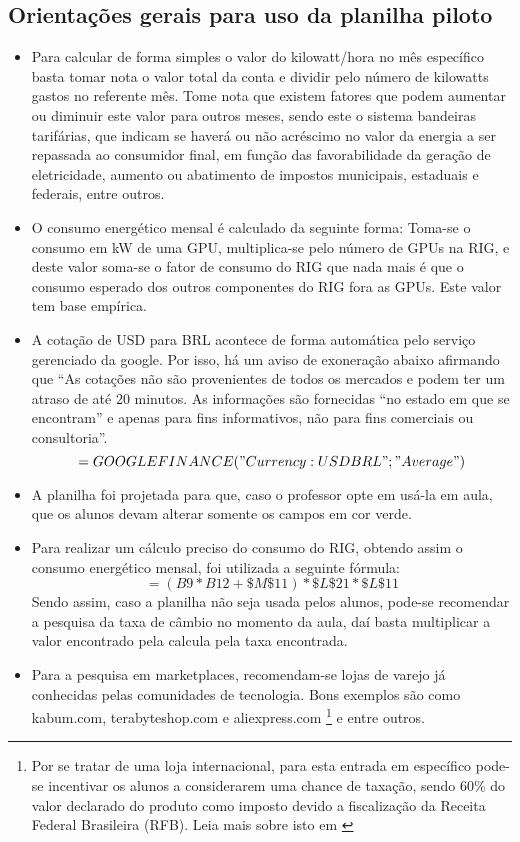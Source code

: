 \subsection{Orientações gerais para uso da planilha piloto}
\begin{itemize} 
	\item Para calcular de forma simples o valor do kilowatt/hora no mês específico basta tomar nota o valor total da conta e dividir pelo número de kilowatts gastos no referente mês. Tome nota que existem fatores que podem aumentar ou diminuir este valor para outros meses, sendo este o sistema bandeiras tarifárias, que indicam se haverá ou não acréscimo no valor da energia a ser repassada ao consumidor final, em função das favorabilidade da geração de eletricidade, aumento ou abatimento de impostos municipais, estaduais e federais, entre outros.
	\item O consumo energético mensal é calculado da seguinte forma:
	Toma-se o consumo em kW de uma GPU,  multiplica-se pelo número de GPUs na RIG, e deste valor soma-se o fator de consumo do RIG que nada mais é que o consumo esperado dos outros componentes do RIG fora as GPUs. Este valor tem base empírica.   
	\item {} A cotação de USD para BRL acontece de forma automática pelo serviço gerenciado da google. Por isso, há um aviso de exoneração abaixo afirmando que ``As cotações não são provenientes de todos os mercados e podem ter um atraso de até 20 minutos. As informações são fornecidas ``no estado em que se encontram'' e apenas para fins informativos, não para fins comerciais ou consultoria''. 
	\begin{equation}\label{key1}
		=GOOGLEFINANCE("Currency:USDBRL";"Average")
	\end{equation}
	\item A planilha foi projetada para que, caso o professor opte em usá-la em aula, que os alunos devam alterar somente os campos em cor verde.
	\item Para realizar um cálculo preciso do consumo do RIG,  obtendo assim o consumo energético mensal, foi utilizada a seguinte fórmula: 
	\begin{equation}\label{key}
		= (B9*B12+\$M\$11)*\$L\$21*\$L\$11
	\end{equation} 
	Sendo assim, caso a planilha não seja usada pelos alunos, pode-se recomendar a pesquisa da taxa de câmbio no momento da aula, daí basta multiplicar a valor encontrado pela calcula pela taxa encontrada.
	\item {} Para a pesquisa em marketplaces, recomendam-se lojas de varejo já conhecidas pelas comunidades de tecnologia. Bons exemplos são como kabum.com, terabyteshop.com e aliexpress.com \footnote{Por se tratar de uma loja internacional, para esta entrada em específico pode-se incentivar os alunos a considerarem uma chance de taxação, sendo 60\% do valor declarado do produto como imposto devido a fiscalização da Receita Federal Brasileira (RFB). Leia mais sobre isto em \cite{PROMOBIT}} e entre outros.
\end{itemize}





